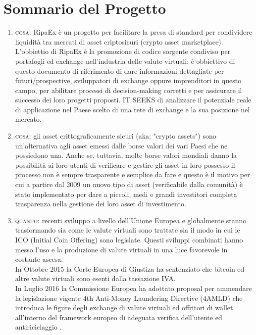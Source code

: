 \documentclass[11pt,fleqn,oneside]{book} %
\begin{document}
\section{Sommario del Progetto}
\begin{enumerate}
	\item \textsc{cosa}: RipaEx è un progetto per facilitare la presa di standard per condividere liquidità tra mercati di asset
	criptosicuri (crypto asset marketplace).
	L'obbiettio di RipaEx è la promozione di codice sorgente condiviso per portafogli ed exchange nell'industria delle valute
	virtuali: è obbiettivo di questo documento di riferimento di dare informazioni dettagliate per futuri/prospective,
	sviluppatori di exchange oppure imprenditori in questo campo, per abilitare processi di decision-making corretti e per 
	assicurare il successo dei loro progetti proposti.
	IT SEEKS di analizzare il potenziale reale di applicazione nel Paese scelto di una rete di exchange e la sua posizione nel mercato.
	\item \textsc{cosa}: gli asset crittograficamente sicuri (aka: "crypto assets") sono un'alternativa agli asset emessi dalle borse
	valori dei vari Paesi che ne possiedono una. Anche se, tuttavia, molte borse valori mondiali danno la possibilità ai loro 
	utenti di verificare e gestire gli asset in loro possesso il processo non è sempre trasparente e semplice da fare e questo è il motivo 
	per cui a partire dal 2009 \cite{bitcoin} un nuovo tipo di asset (verificabile dalla comunità) è stato implementato
	per dare a piccoli, medi e grandi investitori completa trasparenza nella gestione dei loro asset di investimento.
	\item \textsc{quanto}: recenti sviluppo a livello dell'Unione Europea e globalmente stanno trasformando sia come le valute virtuali
	sono trattate sia il modo in cui le ICO (Initial Coin Offering) sono legislate. Questi sviluppi combinati hanno messo
	l'uso e la produzione di valute virtuali in una luce favorevole in costante ascesa. \\
	In Ottobre 2015 la Corte Europea di Giustiza ha sentenziato che bitcoin ed altre valute virtuali sono esenti dalla tassazione IVA. \\
	In Luglio 2016 la Commissione Europea ha adottato proposal per ammendare la legislazione vigente 4th Anti-Money Laundering Directive (4AMLD) 
	che introduca le figure degli exchange di valute virtuali ed offritori di wallet all'interno del framework europeo di adeguata verifica
	dell'utente ed antiriciclaggio \cite{EUAMLCrypto}.\\

\end{enumerate}
\end{document}
